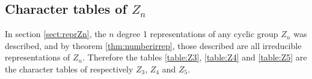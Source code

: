 \subsection{Character tables of $Z_n$}

In section \ref{sect:reprZn}, the $n$ degree 1 representations of any cyclic group $Z_n$ was described, and by theorem \ref{thm:numberirrep}, those described are all irreducible representations of $Z_n$. Therefore the tables \ref{table:Z3}, \ref{table:Z4} and \ref{table:Z5} are the character tables of respectively $Z_3$, $Z_4$ and $Z_5$.

